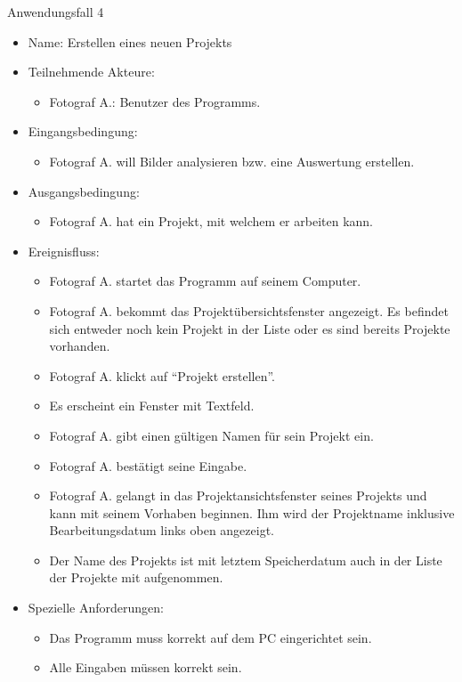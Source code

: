 	\begin{description}
		\item[Anwendungsfall 4]
	\end{description}
	
		\begin{itemize}
			\item Name: Erstellen eines neuen Projekts
			\item Teilnehmende Akteure:
			\begin{itemize}
				\item	Fotograf A.: Benutzer des Programms.
			\end{itemize}
			\item Eingangsbedingung:
			\begin{itemize}
				\item Fotograf A. will Bilder analysieren bzw. eine Auswertung erstellen.						
			\end{itemize}
			\item Ausgangsbedingung:
			\begin{itemize}
				\item	Fotograf A. hat ein Projekt, mit welchem er arbeiten kann.		
			\end{itemize}
			\item Ereignisfluss:
			\begin{itemize}
				\item Fotograf A. startet das Programm auf seinem Computer.
				\item Fotograf A. bekommt das Projektübersichtsfenster angezeigt. Es befindet sich entweder noch kein Projekt in der Liste oder es sind bereits Projekte vorhanden.
				\item Fotograf A. klickt auf "`Projekt erstellen"'.
				\item Es erscheint ein Fenster mit Textfeld.
				\item Fotograf A. gibt einen gültigen Namen für sein Projekt ein.
				\item Fotograf A. bestätigt seine Eingabe.
				\item Fotograf A. gelangt in das Projektansichtsfenster seines Projekts und kann mit seinem Vorhaben beginnen. Ihm wird der Projektname inklusive Bearbeitungsdatum links oben angezeigt.
				\item Der Name des Projekts ist mit letztem Speicherdatum auch in der Liste der Projekte mit aufgenommen.
			\end{itemize}
			\item Spezielle Anforderungen:
			\begin{itemize}
				\item	Das Programm muss korrekt auf dem PC eingerichtet sein.
				\item Alle Eingaben müssen korrekt sein.
			\end{itemize}			
		\end{itemize}
		
